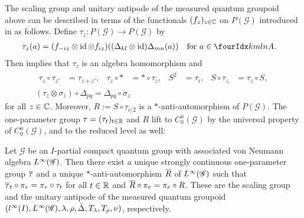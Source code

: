 The scaling group and unitary antipode of the measured quantum
groupoid above can be described in terms of the functionals
$(f_{z})_{z\in \mathbb{C}}$ on $P(\mathscr{G})$ introduced in \cite[Theorem
3.49]{DCT1} as follows.  Define $\tau_{z} \colon P(\mathscr{G}) \to
P(\mathscr{G})$ by
\begin{align*}
\tau_{z}(a) &= (f_{-iz} \otimes \id \otimes f_{iz})((\Delta_{kl}
\otimes \id)\Delta_{mn}(a)) \quad \text{for } a\in \Gr{A}{k}{l}{m}{n}.
\end{align*}
Then \cite[Theorem 3.49]{DCT1} implies that $\tau_{z}$ is an algebra
homomorphism and
\begin{gather} \label{eq:alg-scale}
  \begin{aligned}
    \tau_{z} \circ \tau_{z'} &= \tau_{z+z'}, & \tau_{z}\circ \ast &=
    \ast\circ \tau_{\overline{z}}, & S^{2} &= \tau_{i}, & S \circ
    \tau_{z} &= \tau_{z} \circ S,
  \end{aligned}
 \\  \label{eq:alg-mod-aut-delta} (\tau_{z} \otimes \sigma_{z})
    \circ \Delta_{pq} = \Delta_{pq} \circ \sigma_{z}
  \end{gather}
for all $z\in \mathbb{C}$. Moreover, $R:=S\circ
\tau_{i/2}$ is a $*$-anti-automorphism of $P(\mathscr{G})$.  The
one-parameter group $\tau=(\tau_{t})_{t\in \mathbb{R}}$ and $R$ lift to
$C^{u}_{0}(\mathscr{G})$ by the universal property of
$C^{u}_{0}(\mathscr{G})$, and to the reduced level as well:
\begin{Prop}
  Let $\mathscr{G}$ be an $I$-partial compact quantum group with
  associated von Neumann algebra $L^{\infty}(\mathscr{G})$. Then there exist
a unique strongly continuous one-parameter group $\overline{\tau}$ and
 a unique $*$-anti-automorphism $\overline{R}$ of $L^{\infty}(\mathscr{G})$ such that
 $\overline{\tau}_{t} \circ \pi_{r} = \pi_{r} \circ
\tau_{t}$ for  all $t\in \mathbb{R}$ and
$\overline{R} \circ \pi_{r} = \pi_{r} \circ R$.
 These are the scaling group and the unitary antipode of the measured
 quantum groupoid $(l^{\infty}(I),L^{\infty}(\mathscr{G}), \lambda,\rho,\tilde\Delta,
 T_{\lambda},T_{\rho},\nu)$, respectively.
\end{Prop}
